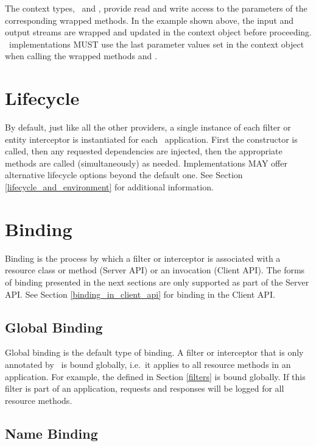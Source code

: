 The context types, \ReaderInterceptorContext\ and \WriterInterceptorContext, provide read and write access to the parameters of the corresponding wrapped methods. In the example shown above, the input and output streams are wrapped and updated in the context object before proceeding. \jaxrs\ implementations MUST use the last parameter values set in the context object when calling the wrapped methods  and .

\section{Lifecycle}

By default, just like all the other providers, a single instance of each filter or entity interceptor is instantiated for each \jaxrs\ application. First the constructor is called, then any requested dependencies are injected, then the appropriate methods are called (simultaneously) as needed. Implementations MAY offer alternative lifecycle options beyond the default one. See Section \ref{lifecycle_and_environment} for additional information.

\section{Binding}

Binding is the process by which a filter or interceptor is associated with a resource class or method (Server API) or an invocation (Client API). The forms of binding presented in the next sections are only supported as part of the Server API. See Section \ref{binding_in_client_api} for binding in the Client API.

\subsection{Global Binding}

Global binding is the default type of binding. A filter or interceptor that is only annotated by \Provider\ is bound globally, i.e.~it applies to all resource methods in an application. For example, the  defined in Section \ref{filters} is bound globally. If this filter is part of an application, requests and responses will be logged for all resource methods. 

\subsection{Name Binding}
\label{Name_Binding}


